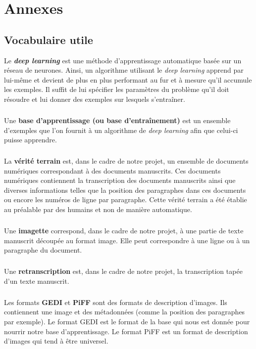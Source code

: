 \chapter{Annexes}

\section*{Vocabulaire utile}

Le \textbf{\textit{deep learning}} est une méthode d’apprentissage automatique
basée sur un réseau de neurones. Ainsi, un algorithme utilisant le \textit{deep
learning} apprend par lui-même et devient de plus en plus performant au fur et
à mesure qu’il accumule les exemples. Il suffit de lui spécifier les paramètres
du problème qu’il doit résoudre et lui donner des exemples sur lesquels
s’entraîner. 

\paragraph{}
Une \textbf{base d’apprentissage (ou base d'entraînement)} est un ensemble
d’exemples que l’on fournit à un algorithme de \textit{deep learning} afin que
celui-ci puisse apprendre.

\paragraph{}
La \textbf{vérité terrain} est, dans le cadre de notre projet, un ensemble de
documents numériques correspondant à des documents manuscrits. Ces documents
numériques contiennent la transcription des documents manuscrits ainsi que
diverses informations telles que la position des paragraphes dans ces documents
ou encore les numéros de ligne par paragraphe. Cette vérité terrain a été
établie au préalable par des humains et non de manière automatique.

\paragraph{}
Une \textbf{imagette} correspond, dans le cadre de notre projet, à une partie
de texte manuscrit découpée au format image. Elle peut correspondre à une ligne
ou à un paragraphe du document.

\paragraph{}
Une \textbf{retranscription} est, dans le cadre de notre projet, la
transcription tapée d’un texte manuscrit.

\paragraph{}
Les formats \textbf{GEDI} et \textbf{PiFF} sont des formats de description
d’images. Ils contiennent une image et des métadonnées (comme la position des
paragraphes par exemple). Le format GEDI est le format de la base qui nous est
donnée pour nourrir notre base d’apprentissage. Le format PiFF est un format
de description d’images qui tend à être universel.